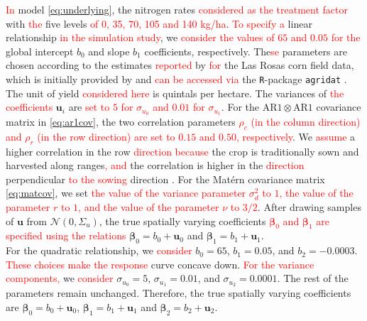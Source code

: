 \documentclass[a4paper]{article} 	%
\newcommand{\Matern}{Mat\'ern }
\newcommand{\N}{\mathcal{N}}
\newcommand{\AR}{\mathrm{AR1}}
\newcommand{\revision}[1]{\textcolor{red}{#1}}
\begin{document}
\revision{In} model \eqref{eq:underlying}, the nitrogen rates \revision{considered as the treatment factor} with \revision{the} five levels \revision{of 0, 35, 70, 105 and 140 kg/ha}. \revision{To specify a} linear relationship \revision{in the simulation study}, we \revision{consider the values of $65$ and $0.05$ for the} global intercept $b_0$ and slope $b_1$ coefficients, respectively. The\revision{se} parameters are chosen according to the estimates \revision{reported} by \textcite{Rakshit2020Novel, Cao2022Bayesian} \revision{for} the Las Rosas corn field data, which is initially provided by \textcite{Luc2004ASpatial} and \revision{can be accessed via} the \texttt{R}-package \texttt{agridat} \parencite{White2008Agridat}. The unit of yield \revision{considered here} is quintals per hectare. The variances of \revision{the coefficients} $\bm{u}_i$ are \revision{set to $5$ for $\sigma_{u_0}$ and $0.01$ for $\sigma_{u_1}$}. For the $\AR\otimes\AR$ covariance matrix in \eqref{eq:ar1cov}, the two correlation parameters \revision{$\rho_c$ (in the column direction) and $\rho_r$ (in the row direction) are set to $0.15$ and $0.50$, respectively}. We \revision{assume} a higher correlation in the row \revision{direction because} the crop is traditionally sown and harvested along ranges\revision{,} \revision{and} the correlation is higher in the \revision{direction} perpendicular \revision{to the sowing} direction \parencite{Marchant2019Establishinga}. For the \Matern covariance matrix \eqref{eq:matcov}, we set \revision{the value of the variance parameter $\sigma_d^2$ to $1$, the value of the parameter $r$ to $1$, and the value of the parameter $\nu$ to $3/2$}. After drawing samples of $\bm{u}$ from $\N(0,\Sigma_u)$, the true spatially varying coefficients \revision{$\bm{\beta}_0$ and $\bm{\beta}_1$ are specified using the relations} $\bm{\beta}_0 = b_0 + \bm{u}_0$ and $\bm{\beta}_1 = b_1 + \bm{u}_1$. \\


For the quadratic relationship, we \revision{consider}  $b_0 = 65$, $b_1 = 0.05$, and $b_2 = -0.0003$. \revision{These choices make the response} curve concave down. \revision{For the variance components,} we \revision{consider} $\sigma_{u_0} = 5$, $\sigma_{u_1}=0.01$, and $\sigma_{u_2}=0.0001$. The rest of the parameters remain unchanged. Therefore, the true spatially varying coefficients are $\bm{\beta}_0 = b_0 + \bm{u}_0$, $\bm{\beta}_1 = b_1 + \bm{u}_1$ and $\bm{\beta}_2 = b_2 + \bm{u}_2$.
\end{document}

